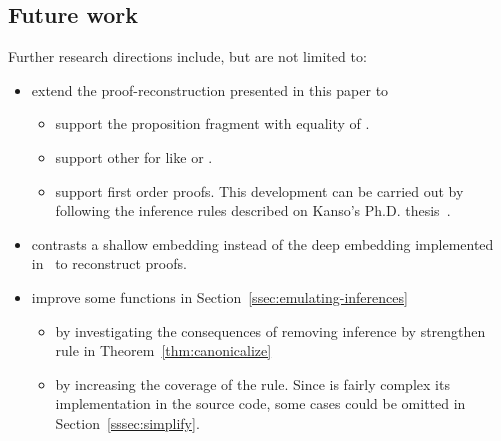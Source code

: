 \documentclass[../main.tex]{subfiles}
\begin{document}
\subsection*{Future work}

Further research directions include, but are not limited to:

\begin{itemize}
\item extend the proof-reconstruction presented in this paper to
  \begin{itemize}
    \item support the proposition fragment with equality of \Metis.
    \item support other \ATPs for \CPL like  or .
    \item support \Metis first order proofs.
This development can be carried out by following the 
inference rules described on Kanso's Ph.D. thesis~\cite{Kanso2012}.
  \end{itemize}
\item contrasts a shallow embedding instead
of the deep embedding implemented in~\cite{AgdaProp} to reconstruct proofs.
\item improve some functions in Section~\ref{ssec:emulating-inferences}
\begin{itemize}
  \item by investigating the consequences of removing \clausify
inference by strengthen \canonicalize rule in Theorem~\ref{thm:canonicalize}
  \item by increasing the coverage of the \simplify rule. Since is fairly
complex its implementation in the \Metis source code, some cases could be omitted in Section~\ref{sssec:simplify}.
\end{itemize}


\end{itemize}
\end{document}
